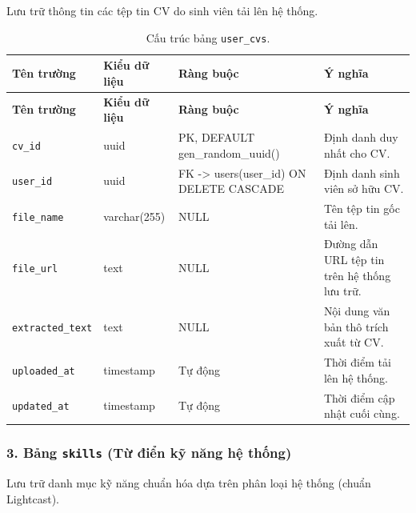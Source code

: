 Lưu trữ thông tin các tệp tin CV do sinh viên tải lên hệ thống.

\begin{footnotesize}\begin{longtable}{|L{3.5cm}|L{2.0cm}|L{3.0cm}|L{5.5cm}|}
\caption{Cấu trúc bảng \texttt{user\_cvs}.}
\label{tab:user_cvs} \\
\hline
\textbf{Tên trường} & \textbf{Kiểu dữ liệu} & \textbf{Ràng buộc} & \textbf{Ý nghĩa} \\
\hline
\endfirsthead
\hline
\textbf{Tên trường} & \textbf{Kiểu dữ liệu} & \textbf{Ràng buộc} & \textbf{Ý nghĩa} \\
\hline
\endhead
\texttt{cv\_id} & uuid & PK, DEFAULT gen\_random\_uuid() & Định danh duy nhất cho CV. \\
\hline
\texttt{user\_id} & uuid & FK -> users(user\_id) ON DELETE CASCADE & Định danh sinh viên sở hữu CV. \\
\hline
\texttt{file\_name} & varchar(255) & NULL & Tên tệp tin gốc tải lên. \\
\hline
\texttt{file\_url} & text & NULL & Đường dẫn URL tệp tin trên hệ thống lưu trữ. \\
\hline
\texttt{extracted\_\allowbreak text} & text & NULL & Nội dung văn bản thô trích xuất từ CV. \\
\hline
\texttt{uploaded\_at} & timestamp & Tự động & Thời điểm tải lên hệ thống. \\
\hline
\texttt{updated\_at} & timestamp & Tự động & Thời điểm cập nhật cuối cùng. \\
\hline
\end{longtable}
\end{footnotesize}

\subsubsection*{3. Bảng \texttt{skills} (Từ điển kỹ năng hệ thống)}

Lưu trữ danh mục kỹ năng chuẩn hóa dựa trên phân loại hệ thống (chuẩn Lightcast).

